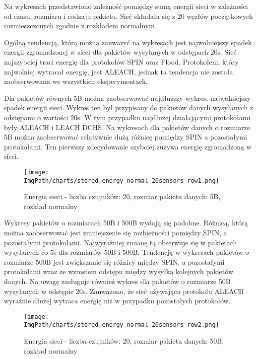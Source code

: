 Na wykresach przedstawiono zależność pomiędzy sumą energii sieci w zależności od czasu, rozmiaru  i rodzaju pakietu. Sieć składała się z 20 węzłów początkowych rozmieszczonych zgodnie z rozkładem normalnym.
  
Ogólną tendencją, którą można zauważyć na wykresach jest najwolniejszy spadek energii zgromadzonej w sieci dla pakietów wysyłanych w odstępach 20s. Sieć najszybciej traci energię dla protokołów SPIN oraz Flood. Protokołem, który najwolniej wytracał energię, jest ALEACH, jednak ta tendencja nie została zaobserwowana we wszystkich eksperymentach.

Dla pakietów równych 5B można zaobserwować najdłuższy wykres, najwolniejszy spadek energii sieci. Wykres ten był przypisany do pakietów danych wysyłanych z odstępami o wartości 20s. W tym przypadku najdłużej działającymi protokołami były ALEACH i LEACH DCHS. Na wykresach dla pakietów danych o rozmiarze 5B można zaobserwować relatywnie dużą różnicę pomiędzy SPIN a pozostałymi protokołami. Ten pierwszy zdecydowanie szybciej zużywa energię zgromadzoną w sieci.

\begin{figure}[H]
	\begin{center}
		\texttt{[image: \\ImgPath/charts/stored\_energy\_normal\_20sensors\_row1.png]}
	\end{center}
	\caption{Energia sieci - liczba czujników: 20, rozmiar pakietu danych: 5B, rozkład normalny}
\end{figure}

Wykresy pakietów o rozmiarach 50B i 500B wydają się podobne. Różnicą, którą można zaobserwować jest zmniejszenie się rozbieżności pomiędzy SPIN, a pozostałymi protokołami. Najwyraźniej zmianę tą obserwuje się w pakietach wysyłanych co 5s dla rozmiarów 50B i 500B. Tendencją w wykresach pakietów o rozmiarze 500B jest zwiększanie się różnicy między SPIN, a pozostałymi protokołami wraz ze wzrostem odstępu między wysyłką kolejnych pakietów danych. Na uwagę zasługuje również wykres dla pakietów o rozmiarze 50B wysyłanych w odstępie 20s. Zauważono, że sieć używająca protokołu ALEACH wyraźnie dłużej wytraca energię niż w przypadku pozostałych protokołów. 

\begin{figure}[H]
	\begin{center}
		\texttt{[image: \\ImgPath/charts/stored\_energy\_normal\_20sensors\_row2.png]}
	\end{center}
	\caption{Energia sieci - liczba czujników: 20, rozmiar pakietu danych: 50B, rozkład normalny}
\end{figure}

